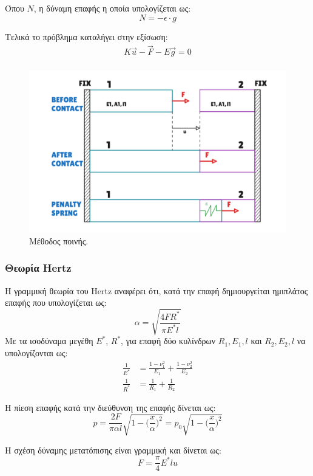 \documentclass{article}
\begin{document}
Όπου $N$, η δύναμη επαφής η οποία υπολογίζεται ως:
\begin{equation}
    N = -\epsilon \cdot g
\end{equation}

Τελικά το πρόβλημα καταλήγει στην εξίσωση:
\begin{align}
    K\vec{u} - \vec{F} - E\vec{g} = 0 \\
\end{align}

\begin{figure}[H]
    \centering
    \includegraphics[width=0.6\linewidth]{media/pen.png}
    \caption{Μέθοδος ποινής.}
    \label{fig:pen}
\end{figure}



\subsubsection{Θεωρία Hertz}
Η γραμμική θεωρία του Hertz αναφέρει ότι, κατά την επαφή δημιουργείται ημιπλάτος επαφής που υπολογίζεται ως:
\begin{equation}
    \alpha = \sqrt{\frac{4 F R^*}{\pi E^* l}}
\end{equation}
Με τα ισοδύναμα μεγέθη $Ε^*$, $R^*$, για επαφή δύο κυλίνδρων $R_1, E_1, l$ και $R_2, E_2, l$ να υπολογίζονται ως:
\begin{align}
    \frac{1}{E^*} & = \frac{1-\nu_1^2}{E_1} + \frac{1-\nu_2^2}{E_2} \\
    \frac{1}{R^*} &= \frac{1}{R_1} + \frac{1}{R_2} 
\end{align}

Η πίεση επαφής κατά την διεύθυνση της επαφής δίνεται ως:
\begin{equation}
    p = \frac{2F}{\pi \alpha l} \sqrt{1 - \bigg(\frac{x}{\alpha}\bigg)^2} = p_0\sqrt{1 - \bigg(\frac{x}{\alpha}\bigg)^2}
\end{equation}


Η σχέση δύναμης μετατόπισης είναι γραμμική και δίνεται ως:
\begin{equation}
    F = \frac{\pi}{4}E^* l u
\end{equation}
\end{document}
